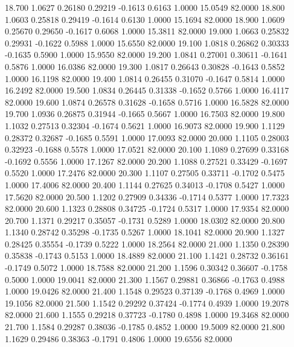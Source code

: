   18.700   1.0627   0.26180   0.29219  -0.1613   0.6163   1.0000  15.0549  82.0000
  18.800   1.0603   0.25818   0.29419  -0.1614   0.6130   1.0000  15.1694  82.0000
  18.900   1.0609   0.25670   0.29650  -0.1617   0.6068   1.0000  15.3811  82.0000
  19.000   1.0663   0.25832   0.29931  -0.1622   0.5988   1.0000  15.6550  82.0000
  19.100   1.0818   0.26862   0.30333  -0.1635   0.5900   1.0000  15.9550  82.0000
  19.200   1.0841   0.27001   0.30611  -0.1641   0.5876   1.0000  16.0386  82.0000
  19.300   1.0817   0.26643   0.30828  -0.1643   0.5852   1.0000  16.1198  82.0000
  19.400   1.0814   0.26455   0.31070  -0.1647   0.5814   1.0000  16.2492  82.0000
  19.500   1.0834   0.26445   0.31338  -0.1652   0.5766   1.0000  16.4117  82.0000
  19.600   1.0874   0.26578   0.31628  -0.1658   0.5716   1.0000  16.5828  82.0000
  19.700   1.0936   0.26875   0.31944  -0.1665   0.5667   1.0000  16.7503  82.0000
  19.800   1.1032   0.27513   0.32304  -0.1674   0.5621   1.0000  16.9073  82.0000
  19.900   1.1129   0.28372   0.32687  -0.1685   0.5591   1.0000  17.0093  82.0000
  20.000   1.1105   0.28003   0.32923  -0.1688   0.5578   1.0000  17.0521  82.0000
  20.100   1.1089   0.27699   0.33168  -0.1692   0.5556   1.0000  17.1267  82.0000
  20.200   1.1088   0.27521   0.33429  -0.1697   0.5520   1.0000  17.2476  82.0000
  20.300   1.1107   0.27505   0.33711  -0.1702   0.5475   1.0000  17.4006  82.0000
  20.400   1.1144   0.27625   0.34013  -0.1708   0.5427   1.0000  17.5620  82.0000
  20.500   1.1202   0.27909   0.34336  -0.1714   0.5377   1.0000  17.7323  82.0000
  20.600   1.1323   0.28808   0.34725  -0.1724   0.5317   1.0000  17.9354  82.0000
  20.700   1.1371   0.29217   0.35057  -0.1731   0.5289   1.0000  18.0302  82.0000
  20.800   1.1340   0.28742   0.35298  -0.1735   0.5267   1.0000  18.1041  82.0000
  20.900   1.1327   0.28425   0.35554  -0.1739   0.5222   1.0000  18.2564  82.0000
  21.000   1.1350   0.28390   0.35838  -0.1743   0.5153   1.0000  18.4889  82.0000
  21.100   1.1421   0.28732   0.36161  -0.1749   0.5072   1.0000  18.7588  82.0000
  21.200   1.1596   0.30342   0.36607  -0.1758   0.5000   1.0000  19.0041  82.0000
  21.300   1.1567   0.29881   0.36866  -0.1763   0.4988   1.0000  19.0426  82.0000
  21.400   1.1548   0.29523   0.37139  -0.1768   0.4969   1.0000  19.1056  82.0000
  21.500   1.1542   0.29292   0.37424  -0.1774   0.4939   1.0000  19.2078  82.0000
  21.600   1.1555   0.29218   0.37723  -0.1780   0.4898   1.0000  19.3468  82.0000
  21.700   1.1584   0.29287   0.38036  -0.1785   0.4852   1.0000  19.5009  82.0000
  21.800   1.1629   0.29486   0.38363  -0.1791   0.4806   1.0000  19.6556  82.0000
